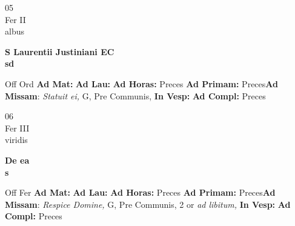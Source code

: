 \documentclass[10pt, openany]{book}
\begin{document}
    \begin{center}
        \begin{minipage}{3.5in}
            \vspace{2em}
            \begin{minipage}{0.5in}
                {\Huge 05} \\
                {\normalsize Fer II} \\
                {\normalsize albus}
            \end{minipage}
            \begin{minipage}{3.0in}
                \textbf{ \large S Laurentii Justiniani EC \\
                \textnormal{\normalsize sd}} \\ 
            \end{minipage}
            \begin{justify}Off Ord
                \textbf{Ad Mat: }
                \textbf{Ad Lau: }
                \textbf{Ad Horas: }Preces
                \textbf{Ad Primam: }Preces\textbf{Ad Missam}: \textit{Statuit ei,} G, Pre Communis,  
                \textbf{In Vesp: }
                \textbf{Ad Compl: }Preces
            \end{justify}
        \end{minipage}
    \end{center}

    \begin{center}
        \begin{minipage}{3.5in}
            \vspace{2em}
            \begin{minipage}{0.5in}
                {\Huge 06} \\
                {\normalsize Fer III} \\
                {\normalsize viridis}
            \end{minipage}
            \begin{minipage}{3.0in}
                \textbf{ \large De ea \\
                \textnormal{\normalsize s}} \\ 
            \end{minipage}
            \begin{justify}Off Fer
                \textbf{Ad Mat: }
                \textbf{Ad Lau: }
                \textbf{Ad Horas: }Preces
                \textbf{Ad Primam: }Preces\textbf{Ad Missam}: \textit{Respice Domine,} G, Pre Communis, 2 or \textit{ad libitum,}  
                \textbf{In Vesp: }
                \textbf{Ad Compl: }Preces
            \end{justify}
        \end{minipage}
    \end{center}
\end{document}
